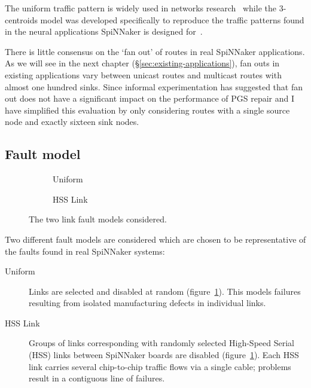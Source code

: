 			The uniform traffic pattern is widely used in networks
			research~\cite[chapter~23]{dally04} while the 3-centroids model was
			developed specifically to reproduce the traffic patterns found in the
			neural applications SpiNNaker is designed for~\cite{navaridas14}.
			
			There is little consensus on the `fan out' of routes in real SpiNNaker
			applications. As we will see in the next chapter
			(\S\ref{sec:existing-applications}), fan outs in existing applications
			vary between unicast routes and multicast routes with almost one hundred
			sinks. Since informal experimentation has suggested that fan out does not
			have a significant impact on the performance of PGS repair and I have
			simplified this evaluation by only considering routes with a single
			source node and exactly sixteen sink nodes.
		
		\subsection{Fault model}
			
			\begin{figure}
				\center
				\begin{subfigure}{0.48\linewidth}
					\hspace*{-1.5cm}
					
					\caption{Uniform}
					\label{fig:fault-example-uniform}
				\end{subfigure}
				\begin{subfigure}{0.48\linewidth}
					\hspace*{-1.5cm}
					
					\caption{HSS Link}
					\label{fig:fault-example-hss}
				\end{subfigure}
				
				\caption{The two link fault models considered.}
				\label{fig:fault-example}
			\end{figure}
			
			Two different fault models are considered which are chosen to be
			representative of the faults found in real SpiNNaker systems:
			
			\begin{description}
				
				\item[Uniform] Links are selected and disabled at random
				(figure~\ref{fig:fault-example-uniform}). This models failures
				resulting from isolated manufacturing defects in individual links.
				
				\item[HSS Link] Groups of links corresponding with randomly selected
				High-Speed Serial (HSS) links between SpiNNaker boards are disabled
				(figure~\ref{fig:fault-example-uniform}). Each HSS link carries several
				chip-to-chip traffic flows via a single cable; problems result in a
				contiguous line of failures.
				
			\end{description}
			

